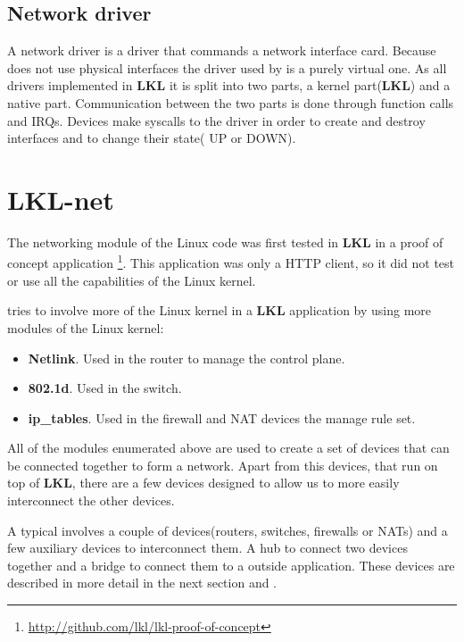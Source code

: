 \subsection{Network driver}
\label{sub-sec:net-driver}

A network driver is a driver that commands a network interface card. Because 
\textbf{\project} does not use physical interfaces
the driver used by \textbf{\project} is a purely virtual 
one. As all drivers implemented in \textbf{LKL} 
it is split into two parts, a kernel part(\textbf{LKL}) and 
a native part. Communication between the two parts
is done through function calls and IRQs.
Devices make syscalls to the driver in order to create and
destroy interfaces and to change their state( UP or DOWN).

\section{LKL-net}
\label{sec:lkl-net}

The networking module of the Linux code was first tested in \textbf{LKL} in a proof of concept application
\footnote{\url{http://github.com/lkl/lkl-proof-of-concept}}. This application was only a HTTP client, so
it did not test or use all the capabilities of the Linux kernel.

\textbf{\project} tries to involve more of the Linux kernel in a \textbf{LKL} application by using more modules
of the Linux kernel:
\begin{itemize}
  \item \textbf{Netlink}. Used in the router to manage the control plane.
  \item \textbf{802.1d}. Used in the switch.
  \item \textbf{ip_tables}. Used in the firewall and NAT devices the manage rule set.
\end{itemize}

All of the modules enumerated above are used to create a set of devices that can be connected together
to form a network. Apart from this devices, that run on top of \textbf{LKL}, there are a few devices designed
to allow us to more easily interconnect the other devices.

A typical \textbf{\project} involves a couple of devices(routers, switches, firewalls or NATs) and a few
auxiliary devices to interconnect them. A hub to connect two devices together and a bridge to connect them to
a outside application. These devices are described in more detail in the next section and .

